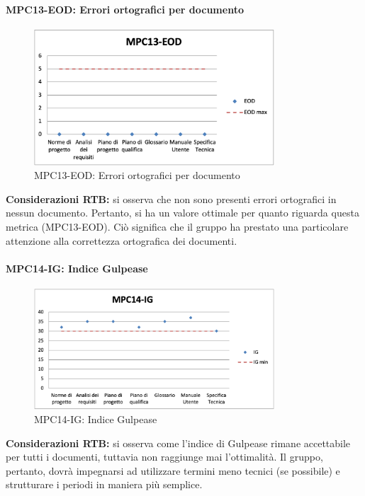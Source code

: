 \paragraph{MPC13-EOD: Errori ortografici per documento}
\begin{figure}[h!] 
    \centering
    \includegraphics[width=0.8\textwidth]{images/MPC13-EOD.png}
    \caption{MPC13-EOD: Errori ortografici per documento}
\end{figure}
\noindent \textbf{Considerazioni RTB:} si osserva che non sono presenti errori ortografici in nessun documento. Pertanto, si ha un valore ottimale per quanto riguarda questa metrica (MPC13-EOD). Ciò significa che il gruppo ha prestato una particolare attenzione alla correttezza ortografica dei documenti.


\paragraph{MPC14-IG: Indice Gulpease}
\begin{figure}[h!] 
    \centering
    \includegraphics[width=0.8\textwidth]{images/MPC14-IG.png}
    \caption{MPC14-IG: Indice Gulpease}
\end{figure}
\noindent \textbf{Considerazioni RTB:} si osserva come l'indice di Gulpease rimane accettabile per tutti i documenti, tuttavia non raggiunge mai l'ottimalità. Il gruppo, pertanto, dovrà impegnarsi ad utilizzare termini meno tecnici (se possibile) e strutturare i periodi in maniera più semplice.

